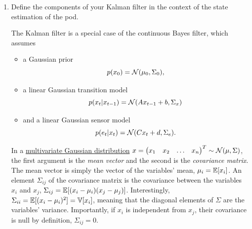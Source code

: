 \documentclass[11pt, a4paper]{article}
\begin{document}
\begin{enumerate}
    \item Define the components of your Kalman filter in the context of the state estimation of the pod.
    
    \begin{solution}
        The Kalman filter is a special case of the continuous Bayes filter, which assumes
        \begin{itemize}
            \item a Gaussian prior
            \begin{equation*}
                p(x_0) = \mathcal{N}(\mu_0, \Sigma_0),
            \end{equation*}
            \item a linear Gaussian transition model
            \begin{equation*}
                p(x_t \vert x_{t - 1}) = \mathcal{N}(A x_{t - 1} + b, \Sigma_x)
            \end{equation*}
            \item and a linear Gaussian sensor model
            \begin{equation*}
                p(e_t \vert x_t) = \mathcal{N}(C x_t + d, \Sigma_e).
            \end{equation*}
        \end{itemize}
        In a \href{https://en.wikipedia.org/wiki/Multivariate_normal_distribution}{multivariate Gaussian distribution} $x = \begin{pmatrix}x_1 & x_2 & \dots & x_n\end{pmatrix}^T \sim \mathcal{N}(\mu, \Sigma)$, the first argument is the \emph{mean vector} and the second is the \emph{covariance matrix}. The mean vector is simply the vector of the variables' mean, \ie{} $\mu_i = \mathbb{E}[x_i]$. An element $\Sigma_{ij}$ of the covariance matrix is the covariance between the variables $x_i$ and $x_j$, \ie{} $\Sigma_{ij} = \mathbb{E}[(x_i - \mu_i) (x_j - \mu_j)]$. Interestingly, $\Sigma_{ii} = \mathbb{E}[(x_i - \mu_i)^2] = \mathbb{V}[x_i]$, meaning that the diagonal elements of $\Sigma$ are the variables' variance. Importantly, if $x_i$ is independent from $x_j$, their covariance is null by definition, \ie{} $\Sigma_{ij} = 0$.     
        

\end{solution}
\end{enumerate}
\end{document}
